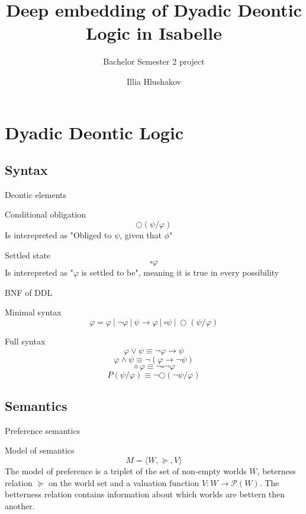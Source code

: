 \documentclass{beamer}
\title[Embedding of DDL]{Deep embedding of Dyadic Deontic Logic in Isabelle}
\subtitle{Bachelor Semester 2 project}
\author[Hlushakov]{Illia Hlushakov}
\institute[Unilux BiCS]{Bachelor in Computer Science\\Univertait Letzebuerg}
\begin{document}
\maketitle

\begin{frame}
\tableofcontents
\end{frame}

\section{Dyadic Deontic Logic}

\subsection{Syntax}
\begin{frame}{Deontic elements}

\begin{block}{Conditional obligation}
	$$\bigcirc(\psi/\varphi)$$
	Is interepreted as "Obliged to $\psi$, given that $\phi$"
\end{block}
	
\begin{block}{Settled state}
	$$\square\varphi$$
	Is interepreted as "$\varphi$ is settled to be", meaning it is true in every possibility
\end{block}	
\end{frame}

\begin{frame}{BNF of DDL}
	\begin{block}{Minimal syntax}
	$$\varphi = \varphi\ |\ \neg\varphi\ |\ \psi \to \varphi\ |\ \square \psi\ |\ \bigcirc(\psi/\varphi)$$
	\end{block}

	\begin{block}{Full syntax}
	$$\varphi\lor\psi \equiv \neg\varphi \to \psi$$
	$$\varphi\land\psi \equiv \neg(\varphi \to \neg\psi)$$
	$$\diamond\varphi \equiv \neg\square\neg\varphi$$
	$$P(\psi/\varphi) \equiv \neg\bigcirc(\neg\psi/\varphi)$$
	\end{block}
\end{frame}

\subsection{Semantics}

\begin{frame}{Preference semantics}
	\begin{block}{Model of semantics}
	$$M = \langle W,\succeq, V\rangle$$
	The model of preference is a triplet of the set of non-empty worlds $W$, beterness relation $\succeq$ on the world set and a valuation function $V: W \to \mathcal{P}(W)$. The betterness relation contains information about which worlds are bettern then another. 
	\end{block}
\end{frame}
\end{document}
